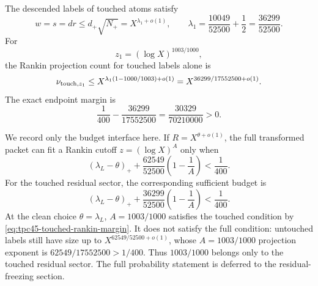 The descended labels of touched atoms satisfy
\begin{equation}
 w=s=dr\le d_+\sqrt{N_+}
 =X^{\lambda_1+o(1)},
 \qquad
 \lambda_1=\frac{10049}{52500}+\frac12
 =\frac{36299}{52500}.
 \label{eq:tpc45-touched-label-exponent}
\end{equation}
For
\begin{equation}
 z_1=(\log X)^{1003/1000},
 \label{eq:tpc45-touched-z1}
\end{equation}
the Rankin projection count for touched labels alone is
\begin{equation}
 \nu_{{\rm touch},z_1}
 \le X^{\lambda_1(1-1000/1003)+o(1)}
 =X^{36299/17552500+o(1)}.
 \label{eq:tpc45-touched-projection-count}
\end{equation}
The exact endpoint margin is
\begin{equation}
 \frac1{400}-\frac{36299}{17552500}
 =\frac{30329}{70210000}>0.
 \label{eq:tpc45-touched-rankin-margin}
\end{equation}

We record only the budget interface here.  If
\(R=X^{\theta+o(1)}\), the full transformed packet can fit a Rankin
cutoff \(z=(\log X)^A\) only when
\begin{equation}
 (\lambda_L-\theta)_+
 +\frac{62549}{52500}\left(1-\frac1A\right)
 <\frac1{400}.
 \label{eq:tpc45-full-tradeoff-interface}
\end{equation}
For the touched residual sector, the corresponding sufficient budget
is
\begin{equation}
 (\lambda_L-\theta)_+
 +\frac{36299}{52500}\left(1-\frac1A\right)
 <\frac1{400}.
 \label{eq:tpc45-touched-tradeoff-interface}
\end{equation}
At the clean choice \(\theta=\lambda_L\), \(A=1003/1000\) satisfies the
touched condition by \eqref{eq:tpc45-touched-rankin-margin}.  It does
not satisfy the full condition: untouched labels still have size up to
\(X^{62549/52500+o(1)}\), whose \(A=1003/1000\) projection exponent is
\(62549/17552500>1/400\).  Thus \(1003/1000\) belongs only to the
touched residual sector.  The full probability statement is deferred
to the residual-freezing section.
